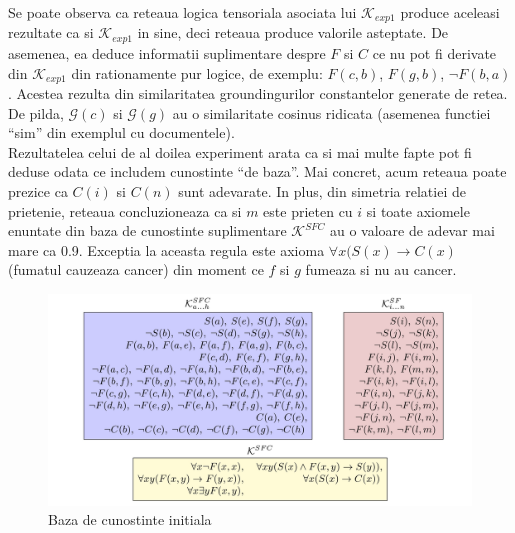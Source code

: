 \documentclass{article}
\begin{document}
Se poate observa ca reteaua logica tensoriala asociata lui $\mathcal{K}_{exp1}$ produce aceleasi rezultate ca si $\mathcal{K}_{exp1}$ in sine, deci reteaua produce valorile asteptate. De asemenea, ea deduce informatii suplimentare despre $F$ si $C$ ce nu pot fi derivate din $\mathcal{K}_{exp1}$ din rationamente pur logice, de exemplu: $F(c, b)$, $F(g, b)$, $\neg F(b, a)$. Acestea rezulta din similaritatea groundingurilor constantelor generate de retea. De pilda, $\mathcal{G}(c)$ si $\mathcal{G}(g)$ au o similaritate cosinus ridicata (asemenea functiei ``sim'' din exemplul cu documentele). \\
Rezultatelea celui de al doilea experiment arata ca si mai multe fapte pot fi deduse odata ce includem cunostinte ``de baza''. Mai concret, acum reteaua poate prezice ca  $C(i)$ si $C(n)$ sunt adevarate. In plus, din simetria relatiei de prietenie, reteaua concluzioneaza ca si $m$ este prieten cu $i$ si toate axiomele enuntate din baza de cunostinte suplimentare $\mathcal{K}^{SFC}$ au o valoare de adevar mai mare ca 0.9. Exceptia la aceasta regula este axioma $\forall x (S(x) \rightarrow C(x)$ (fumatul cauzeaza cancer) din moment ce $f$ si $g$ fumeaza si nu au cancer. \cite{LTN}

\begin{figure}
	\includegraphics[scale=0.2]{kb}
	\caption{Baza de cunostinte initiala \cite{LTN}}
\end{figure}
\end{document}

